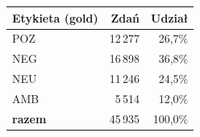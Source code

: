 \begin{tabular}{lrr}
\toprule
Etykieta (gold) & Zdań & Udział \\
\midrule
POZ & 12\,277 & 26{,}7\% \\
NEG & 16\,898 & 36{,}8\% \\
NEU & 11\,246 & 24{,}5\% \\
AMB & 5\,514 & 12{,}0\% \\
\midrule
\textbf{razem} & 45\,935 & 100{,}0\% \\
\bottomrule
\end{tabular}
